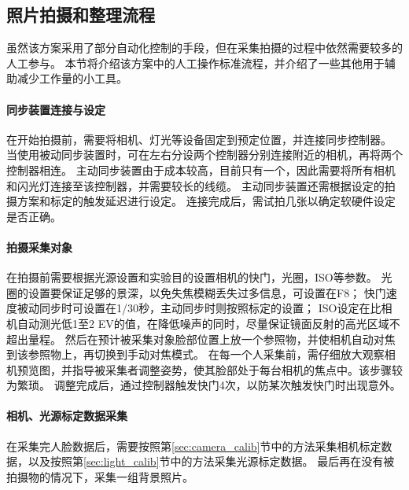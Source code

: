 \subsection{照片拍摄和整理流程}
\label{sec:photo_process}

虽然该方案采用了部分自动化控制的手段，但在采集拍摄的过程中依然需要较多的人工参与。
本节将介绍该方案中的人工操作标准流程，并介绍了一些其他用于辅助减少工作量的小工具。

\paragraph{同步装置连接与设定}
在开始拍摄前，需要将相机、灯光等设备固定到预定位置，并连接同步控制器。
当使用被动同步装置时，可在左右分设两个控制器分别连接附近的相机，再将两个控制器相连。
主动同步装置由于成本较高，目前只有一个，因此需要将所有相机和闪光灯连接至该控制器，并需要较长的线缆。
主动同步装置还需根据设定的拍摄方案和标定的触发延迟进行设定。
连接完成后，需试拍几张以确定软硬件设定是否正确。

\paragraph{拍摄采集对象}
在拍摄前需要根据光源设置和实验目的设置相机的快门，光圈，ISO等参数。
光圈的设置要保证足够的景深，以免失焦模糊丢失过多信息，可设置在F8；
快门速度被动同步时可设置在1/30秒，主动同步时则按照标定的设置；
ISO设定在比相机自动测光低1至2 EV的值，在降低噪声的同时，尽量保证镜面反射的高光区域不超出量程。
然后在预计被采集对象脸部位置上放一个参照物，并使相机自动对焦到该参照物上，再切换到手动对焦模式。
在每一个人采集前，需仔细放大观察相机预览图，并指导被采集者调整姿势，使其脸部处于每台相机的焦点中。该步骤较为繁琐。
调整完成后，通过控制器触发快门4次，以防某次触发快门时出现意外。

\paragraph{相机、光源标定数据采集}
在采集完人脸数据后，需要按照第\ref{sec:camera_calib}节中的方法采集相机标定数据，以及按照第\ref{sec:light_calib}节中的方法采集光源标定数据。
最后再在没有被拍摄物的情况下，采集一组背景照片。

